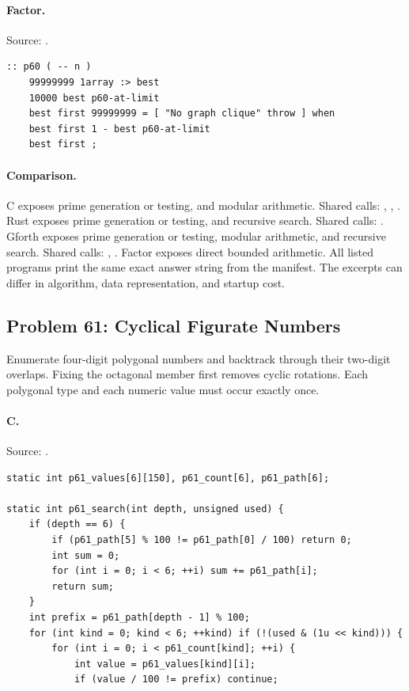 \paragraph{Factor.} Source: .
\begin{lstlisting}
:: p60 ( -- n )
    99999999 1array :> best
    10000 best p60-at-limit
    best first 99999999 = [ "No graph clique" throw ] when
    best first 1 - best p60-at-limit
    best first ;
\end{lstlisting}

\paragraph{Comparison.}
C exposes prime generation or testing, and modular arithmetic. Shared calls: \texttt{}, \texttt{}, \texttt{}. Rust exposes prime generation or testing, and recursive search. Shared calls: \texttt{}. Gforth exposes prime generation or testing, modular arithmetic, and recursive search. Shared calls: \texttt{}, \texttt{}. Factor exposes direct bounded arithmetic.
All listed programs print the same exact answer string from the manifest. The excerpts can differ in algorithm, data representation, and startup cost.

\subsection{Problem 61: Cyclical Figurate Numbers}
\label{walkthrough:p61}
Enumerate four-digit polygonal numbers and backtrack through their two-digit overlaps. Fixing the octagonal member first removes cyclic rotations. Each polygonal type and each numeric value must occur exactly once.

\paragraph{C.} Source: .
\begin{lstlisting}
static int p61_values[6][150], p61_count[6], p61_path[6];

static int p61_search(int depth, unsigned used) {
    if (depth == 6) {
        if (p61_path[5] % 100 != p61_path[0] / 100) return 0;
        int sum = 0;
        for (int i = 0; i < 6; ++i) sum += p61_path[i];
        return sum;
    }
    int prefix = p61_path[depth - 1] % 100;
    for (int kind = 0; kind < 6; ++kind) if (!(used & (1u << kind))) {
        for (int i = 0; i < p61_count[kind]; ++i) {
            int value = p61_values[kind][i];
            if (value / 100 != prefix) continue;
\end{lstlisting}

